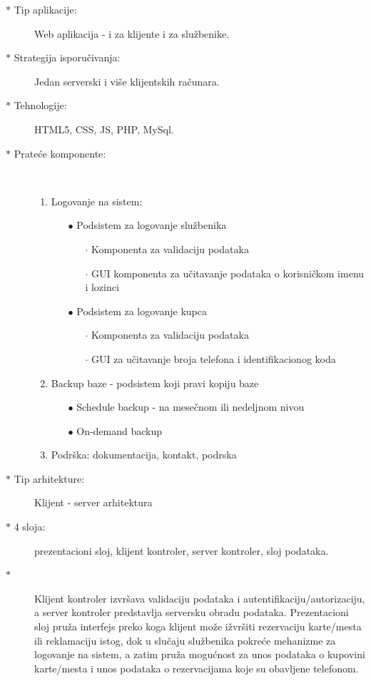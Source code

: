 \begin{description}
	\item[$\ast$ Tip aplikacije:] Web aplikacija - i za klijente i za slu\v zbenike.
	\item[$\ast$ Strategija isporu\v civanja:] Jedan serverski i vi\v se klijentskih ra\v cunara.
	\item[$\ast$ Tehnologije:] HTML5, CSS, JS, PHP, MySql.
	\item[$\ast$ Prate\' ce komponente:] \ \\
		\begin{enumerate}
			\item Logovanje na sistem:
				\begin{enumerate}
					\item[$\bullet$] Podsistem za logovanje slu\v zbenika
						\begin{enumerate}
							\item[$\cdot$] Komponenta za validaciju podataka
							\item[$\cdot$] GUI komponenta za u\v citavanje podataka o korisni\v ckom imenu i lozinci
						\end{enumerate}
					\item[$\bullet$] Podsistem za logovanje kupca
					\begin{enumerate}
						\item[$\cdot$] Komponenta za validaciju podataka
						\item[$\cdot$] GUI za u\v citavanje broja telefona i identifikacionog koda
					\end{enumerate}
					
				\end{enumerate}
			\item Backup baze - podsistem koji pravi kopiju baze
				\begin{enumerate}
					\item[$\bullet$] Schedule backup - na mese\v cnom ili nedeljnom nivou
					\item[$\bullet$] On-demand backup
				\end{enumerate}
			\item Podr\v ska: dokumentacija, kontakt, podrska
		\end{enumerate}
	\item[$\ast$ Tip arhitekture:] Klijent - server arhitektura
	\item[$\ast$ 4 sloja:] prezentacioni sloj, klijent kontroler, server kontroler, sloj podataka. 
	\item[$\ast$] Klijent kontroler izvr\v sava validaciju podataka i autentifikaciju/autorizaciju, a server kontroler predstavlja serversku obradu podataka. Prezentacioni sloj pru\v za interfejs preko koga klijent mo\v ze i\v zvr\v siti rezervaciju karte/mesta ili reklamaciju istog, dok u slu\v caju slu\v zbenika pokre\' ce mehanizme za logovanje na sistem, a zatim pru\v za mogu\' cnost za unos podataka o kupovini karte/mesta i unos podataka o rezervacijama koje su obavljene telefonom.
\end{description}



